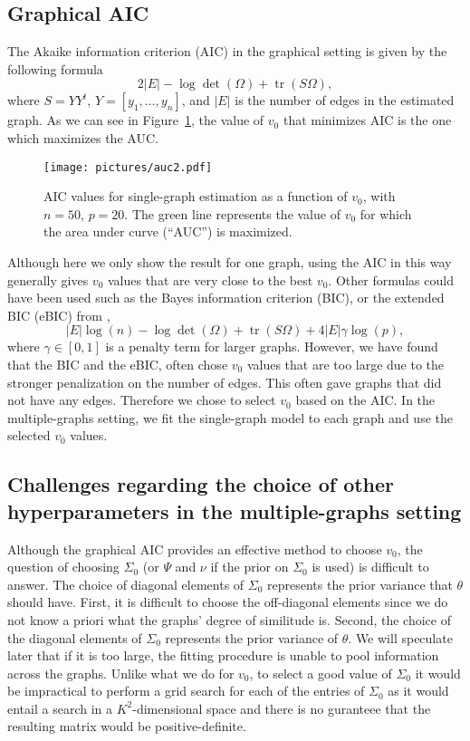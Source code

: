 \documentclass[a4paper, 11pt, oneside]{report}
\DeclareMathOperator{\tr}{tr}
\newcommand{\1}{\mathds{1}}
\begin{document}
\subsection{Graphical AIC}\label{sect:graphical-aic}
The Akaike information criterion (AIC) in the graphical setting is given by the following formula
\[2|E| - \log\det(\Omega) + \tr(S \Omega),\]
where $S = YY^t$, $Y = [y_1, \dots, y_n]$, and $|E|$ is the number of edges in the estimated graph.
As we can see in Figure~\ref{fig:aic}, the value of $v_0$ that minimizes AIC is the one which maximizes the AUC.\@
\begin{figure}[tb]
	\begin{center}
		\texttt{[image: pictures/auc2.pdf]}
	\end{center}
	\caption{AIC values for single-graph estimation as a function of $v_0$, with $n=50$, $p=20$.
		The green line represents the value of $v_0$ for which the area under curve (``AUC'') is maximized.
	}
	\label{fig:aic}
\end{figure}
Although here we only show the result for one graph, using the AIC in this way generally gives
$v_0$ values that are very close to the best $v_0$.
Other formulas could have been used such as the Bayes information criterion (BIC), or the
extended BIC (eBIC) from \citet{foygel2010extended},
\[ |E| \log(n) - \log\det(\Omega) + \tr(S \Omega) + 4 |E| \gamma \log(p), \]
where $\gamma \in [0,1]$ is a penalty term for larger graphs.
However, we have found that the BIC and the eBIC, often chose $v_0$ values that are
too large due to the stronger penalization on the number of edges.
This often gave graphs that did not have any edges.
Therefore we chose to select $v_0$ based on the AIC.\@
In the multiple-graphs setting, we fit the single-graph model
to each graph and use the selected $v_0$ values.

\subsection{Challenges regarding the choice of other hyperparameters in the multiple-graphs setting}
Although the graphical AIC provides an effective method to choose $v_0$,
the question of choosing $\Sigma_0$ (or $\Psi$ and $\nu$ if the prior on $\Sigma_0$ is used)
is difficult to answer.
The choice of diagonal elements of $\Sigma_0$ represents the prior variance that
$\theta$ should have. First, it is difficult to choose the off-diagonal elements
since we do not know a priori what the graphs' degree of similitude is.
Second, the choice of the diagonal elements of $\Sigma_0$ represents the
prior variance of $\theta$. We will speculate later that if it is too large,
the fitting procedure is unable to pool information across the graphs.
Unlike what we do for $v_0$, to select a good value of $\Sigma_0$
it would be impractical to perform a grid search for each of the entries of $\Sigma_0$
as it would entail a search in a $K^2$-dimensional space and there is no guranteee that
the resulting matrix would be positive-definite.
\end{document}
